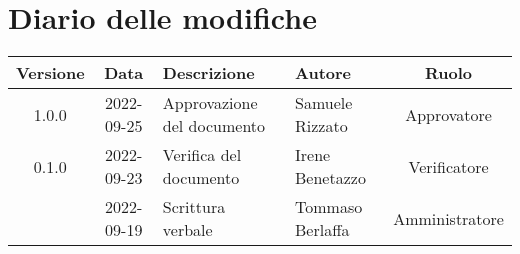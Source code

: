 \section*{Diario delle modifiche}
	\begin{center}
	\renewcommand{\arraystretch}{1.8} %
	\begin{tabular}{ |c|c|m{12em}|m{7em}|c| }
	\hline
	\textbf{Versione} & \textbf{Data} & \textbf{Descrizione} &  \textbf{Autore} &  \textbf{Ruolo} \\ %
	\hline
	1.0.0 & 2022-09-25 & Approvazione del documento & Samuele \newline Rizzato & Approvatore\\
	\hline
	0.1.0 & 2022-09-23 & Verifica del documento &  Irene \newline Benetazzo  & Verificatore\\
	\hline
  & 2022-09-19 & Scrittura verbale & Tommaso \newline Berlaffa & Amministratore\\ %
	\hline
	\end{tabular}
	\end{center}
	\newpage